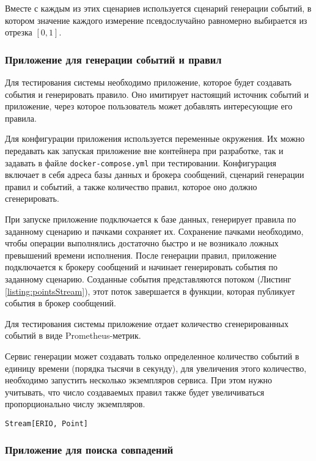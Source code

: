 \documentclass[14pt]{article}
\begin{document}
Вместе с каждым из этих сценариев используется сценарий генерации событий, в котором значение каждого измерение псевдослучайно равномерно выбирается из отрезка $[0, 1]$.

\subsubsection{Приложение для генерации событий и правил}
Для тестирования системы необходимо приложение, которое будет создавать события и генерировать правило. Оно имитирует настоящий источник событий и приложение, через которое пользователь может добавлять интересующие его правила.

Для конфигурации приложения используется переменные окружения. Их можно передавать как запуская приложение вне контейнера при разработке, так и задавать в файле \verb|docker-compose.yml| при тестировании. Конфигурация включает в себя адреса базы данных и брокера сообщений, сценарий генерации правил и событий, а также количество правил, которое оно должно сгенерировать.

При запуске приложение подключается к базе данных, генерирует правила по заданному сценарию и пачками сохраняет их. Сохранение пачками необходимо, чтобы операции выполнялись достаточно быстро и не возникало ложных превышений времени исполнения. После генерации правил, приложение подключается к брокеру сообщений и начинает генерировать события по заданному сценарию. Созданные события представляются потоком (Листинг \ref{listing:pointsStream}), этот поток завершается в функции, которая публикует события в брокер сообщений.

Для тестирования системы приложение отдает количество сгенерированных событий в виде Prometheus-метрик.

Сервис генерации может создавать только определенное количество событий в единицу времени (порядка тысячи в секунду), для увеличения этого количество, необходимо запустить несколько экземпляров сервиса. При этом нужно учитывать, что число создаваемых правил также будет увеличиваться пропорционально числу экземпляров.

\begin{lstlisting}[style=scalaStyle,caption={Тип, описывающий поток событий},label={listing:pointsStream},captionpos=b, float]
Stream[ERIO, Point]
\end{lstlisting}

\subsubsection{Приложение для поиска совпадений}
\label{section:classifier}
\end{document}
